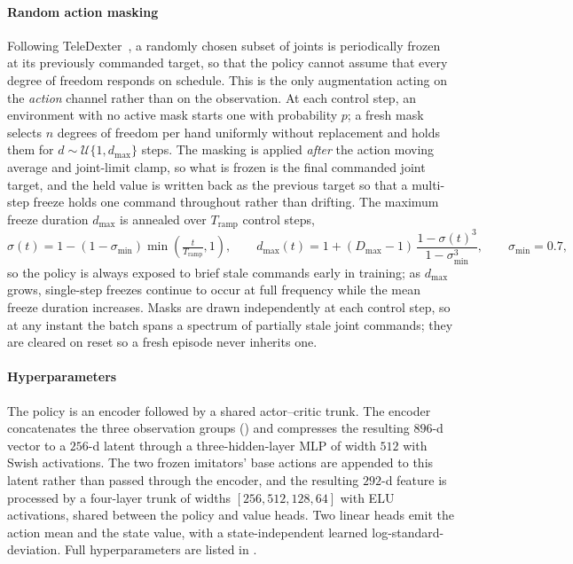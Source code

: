 \paragraph{Random action masking}
Following TeleDexter~\cite{teledexter}, a randomly chosen subset of joints is periodically frozen at its previously commanded target, so that the policy cannot assume that every degree of freedom
responds on schedule. This is the only augmentation acting on the \emph{action} channel rather than on the
observation. At each control step, an environment with no active mask starts one with probability
$p$; a fresh mask selects $n$ degrees of freedom per hand uniformly without replacement and holds
them for $d \sim \mathcal{U}\{1, d_{\max}\}$ steps. The masking is applied \emph{after} the action
moving average and joint-limit clamp, so what is frozen is the final commanded joint target, and
the held value is written back as the previous target so that a multi-step freeze holds one command
throughout rather than drifting. The maximum freeze duration $d_{\max}$ is annealed over
$T_{\text{ramp}}$ control steps,
%
\begin{equation}
  \sigma(t) = 1 - (1 - \sigma_{\min})\min\!\left(\tfrac{t}{T_{\text{ramp}}}, 1\right),
  \qquad
  d_{\max}(t) = 1 + (D_{\max} - 1)\,\frac{1 - \sigma(t)^3}{1 - \sigma_{\min}^3},
  \qquad \sigma_{\min} = 0.7 ,
  \label{eq:mask-ramp}
\end{equation}
%
so the policy is always exposed to brief stale commands early in training; as $d_{\max}$ grows, single-step freezes continue to occur at full frequency while the mean freeze duration increases. Masks are drawn independently at each control step, so at any instant the batch spans a spectrum of partially stale joint commands; they are cleared on reset so a fresh episode never inherits one.

\paragraph{Hyperparameters}
The policy is an encoder followed by a shared actor--critic trunk. The encoder concatenates the three observation groups () and compresses the resulting $896$-d vector to a $256$-d latent through a three-hidden-layer MLP of width $512$ with Swish activations. The two frozen imitators' base actions are appended to this latent rather than passed through the
encoder, and the resulting $292$-d feature is processed by a four-layer trunk of widths $[256, 512, 128, 64]$ with ELU activations, shared between the policy and value heads. Two linear heads emit the action mean and the state value, with a state-independent learned log-standard-deviation. Full hyperparameters are listed in .

